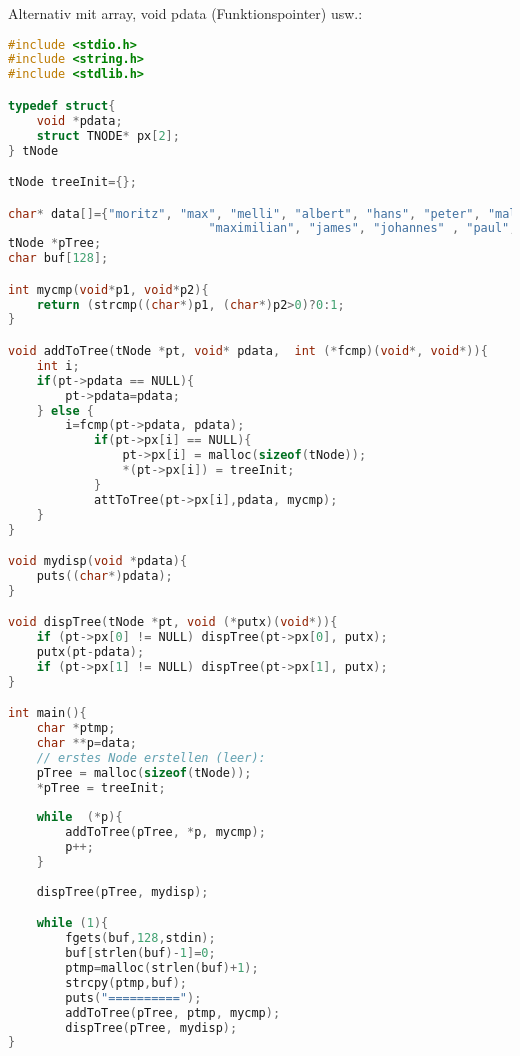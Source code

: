 \documentclass{scrreprt}
\begin{document}
Alternativ mit array, void pdata (Funktionspointer) usw.:
\begin{lstlisting}[language=C]
#include <stdio.h>
#include <string.h>
#include <stdlib.h>

typedef struct{
	void *pdata;
	struct TNODE* px[2];
} tNode

tNode treeInit={};

char* data[]={"moritz", "max", "melli", "albert", "hans", "peter", "malte",
							"maximilian", "james", "johannes" , "paul",  NULL);
tNode *pTree;
char buf[128];

int mycmp(void*p1, void*p2){
	return (strcmp((char*)p1, (char*)p2>0)?0:1;
}

void addToTree(tNode *pt, void* pdata,  int (*fcmp)(void*, void*)){
	int i;
	if(pt->pdata == NULL){
		pt->pdata=pdata;
	} else {
		i=fcmp(pt->pdata, pdata);
			if(pt->px[i] == NULL){
				pt->px[i] = malloc(sizeof(tNode));
				*(pt->px[i]) = treeInit;
			}
			attToTree(pt->px[i],pdata, mycmp);
	}
}

void mydisp(void *pdata){
	puts((char*)pdata);
}

void dispTree(tNode *pt, void (*putx)(void*)){
	if (pt->px[0] != NULL) dispTree(pt->px[0], putx);
	putx(pt-pdata);
	if (pt->px[1] != NULL) dispTree(pt->px[1], putx);
}

int main(){
	char *ptmp;
	char **p=data;
	// erstes Node erstellen (leer):
	pTree = malloc(sizeof(tNode));
	*pTree = treeInit;
	
	while  (*p){
		addToTree(pTree, *p, mycmp); 
		p++;
	}
	
	dispTree(pTree, mydisp);

	while (1){
		fgets(buf,128,stdin);
		buf[strlen(buf)-1]=0;
		ptmp=malloc(strlen(buf)+1);
		strcpy(ptmp,buf);
		puts("==========");
		addToTree(pTree, ptmp, mycmp);
		dispTree(pTree, mydisp);
}
\end{lstlisting}

\newpage
\end{document}
